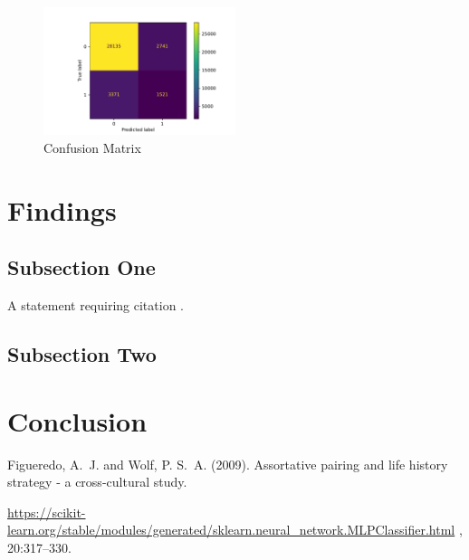 \documentclass[twoside,twocolumn]{article}
\begin{document}
\begin{figure}[h]
	\centering
	\includegraphics[width=0.5\textwidth]{img/tm_mlp_lbgfs_confusion_matrix.pdf}
	\caption{Confusion Matrix}
	\label{fig:confusion_matrix}
\end{figure}


\section{Findings}

\subsection{Subsection One}

A statement requiring citation \cite{Figueredo:2009dg}.
\blindtext %

\subsection{Subsection Two}

\blindtext %

\section{Conclusion}



\begin{thebibliography}{99} %

	Figueredo, A.~J. and Wolf, P. S.~A. (2009).
	\newblock Assortative pairing and life history strategy - a cross-cultural
	study.

	\url{https://scikit-learn.org/stable/modules/generated/sklearn.neural_network.MLPClassifier.html} , 20:317--330.

\end{thebibliography}

\end{document}
